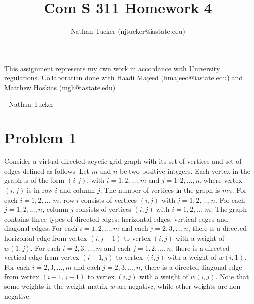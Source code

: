 \documentclass[11pt]{amsart}
\begin{document}
\title{Com S 311 Homework 4}
\author{Nathan Tucker (njtucker@iastate.edu)}
\maketitle

\doublespacing

\vspace{10mm}

\vfill
\begin{flushright}
This assignment represents my own work in accordance with University regulations. Collaboration done with Haadi Majeed (hmajeed@iastate.edu) and Matthew Hoskins (mgh@iastate.edu)

- Nathan Tucker
\end{flushright}
\newpage
\vspace{-.8cm}


\section*{Problem 1}

Consider a virtual directed acyclic grid graph with its set of vertices and set of edges
defined as follows. Let $m$ and $n$ be two positive integers.
Each vertex in the graph is of the form $(i, j)$,
with $i = 1, 2, ..., m$ and $j = 1, 2, ..., n$, where vertex $(i, j)$
is in row $i$ and column $j$. The number of vertices in the graph is $mn$.
For each $i = 1, 2, ..., m$, row $i$ consists of 
vertices $(i, j)$ with $j = 1, 2, ..., n$.
For each $j = 1, 2, ..., n$, column $j$
consists of vertices $(i, j)$ with $i = 1, 2, ..., m$.
The graph contains three types of directed edges: horizontal edges, vertical edges
and diagonal edges. For each $i = 1, 2, ..., m$ and each $j = 2, 3, ..., n$,
there is a directed horizontal edge from vertex $(i, j-1)$ to vertex $(i, j)$ with a weight of $w(1, j)$.
For each $i = 2, 3, ..., m$ and each $j = 1, 2, ..., n$,
there is a directed vertical edge from vertex $(i-1, j)$ to vertex $(i, j)$ with a weight of $w(i, 1)$.
For each $i = 2, 3, ..., m$ and each $j = 2, 3, ..., n$,
there is a directed diagonal edge from vertex $(i-1, j-1)$ to vertex $(i, j)$
with a weight of $w(i, j)$.
Note that some weights in the weight matrix $w$ are negative,
while other weights are non-negative.
\end{document}
